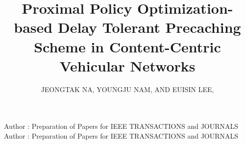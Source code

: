 


\title{Proximal Policy Optimization-based Delay Tolerant Precaching Scheme in Content-Centric Vehicular Networks}
\author{\uppercase{Jeongtak Na}, 
\uppercase{Youngju Nam},
AND \uppercase{Euisin Lee},
}

\address[1]{School of Information and Communication Engineering Chungbuk National University Cheongju, Republic of Korea (e-mail: jeongtak\_na@chungbuk.ac.kr)}
\address[2]{School of Software Kunsan National University Gunsan, Republic of Korea (e-mail: imnyj@kunsan.ac.kr)}
\address[3]{School of Information and Communication Engineering Chungbuk National University Cheongju, Republic of Korea (e-mail: eslee@chungbuk.ac.kr)}


\markboth
{Author \headeretal: Preparation of Papers for IEEE TRANSACTIONS and JOURNALS}
{Author \headeretal: Preparation of Papers for IEEE TRANSACTIONS and JOURNALS}



